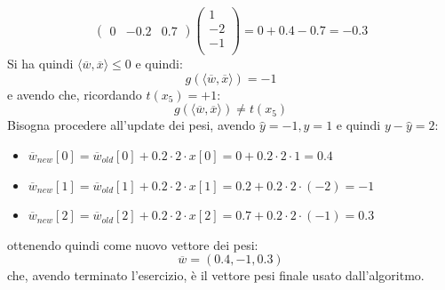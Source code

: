 \begin{esercizio}
\[							\left(\begin{matrix}
							0 & -0.2 & 0.7
							\end{matrix}\right)
							\left(
							\begin{matrix}
								1  \\
								-2 \\
								-1 \\
							\end{matrix}
							\right)= 0+0.4-0.7 = -0.3
						\]
						Si ha quindi $\langle \overline{w}, \overline{x}\rangle \leq 0$ e quindi:
						\[g(\langle \overline{w}, \overline{x}\rangle)=-1\]
						e avendo che, ricordando $t(x_5)=+1$:
						\[g(\langle \overline{w}, \overline{x}\rangle)\neq t(x_5)\]
						Bisogna procedere all'update dei pesi, avendo $\hat{y}=-1, y=1$ e quindi
						$y-\hat{y}=2$:
						\begin{itemize}
							\item
							      $\overline{w}_{new}[0]=\overline{w}_{old}[0]+0.2\cdot 2\cdot
							      x[0]=0+0.2\cdot 2\cdot 1=0.4$ 
							\item
							      $\overline{w}_{new}[1]=\overline{w}_{old}[1]+0.2\cdot 2\cdot
							      x[1]=0.2+0.2\cdot 2\cdot (-2)=-1$ 
							\item
							      $\overline{w}_{new}[2]=\overline{w}_{old}[2]+0.2\cdot 2\cdot x[2]=0.7+0.2
							      \cdot 2\cdot(-1)=0.3$    
						\end{itemize}
						ottenendo quindi come nuovo vettore dei pesi:
						\[\overline{w}=(0.4, -1, 0.3)\]
						che, avendo terminato l'esercizio, è il vettore pesi finale usato
						dall'algoritmo. 
					\end{esercizio}
